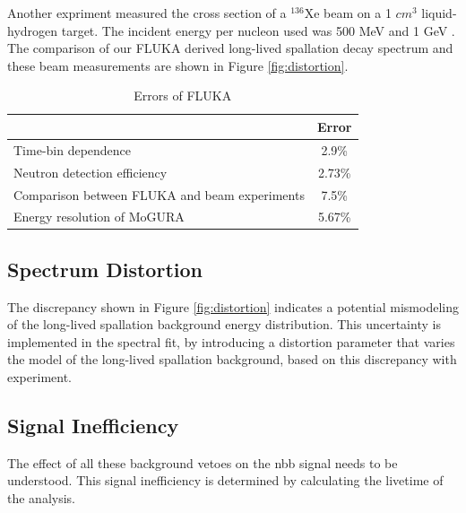 Another expriment measured the cross section of a $^{136}$Xe beam on a 1 $cm^3$ liquid-hydrogen target. The incident energy per nucleon used was 500 MeV \cite{xenonbeam_500MeV} and 1 GeV \cite{xenonbeam_1GeV}. The comparison of our FLUKA derived long-lived spallation decay spectrum and these beam measurements are shown in Figure \ref{fig:distortion}. 


\begin{table}[h]
	\centering
	\begin{tabular}{lc}
		\hline
		& Error \\
		\hline
		Time-bin dependence & 2.9\% \\
		Neutron detection efficiency & 2.73\% \\
		Comparison between FLUKA and beam experiments & 7.5\% \\
		Energy resolution of MoGURA & 5.67\% \\
		\hline
	\end{tabular}
	\caption{Errors of FLUKA}
	\label{tab:fluka_error}
\end{table}

\subsection*{Spectrum Distortion}
The discrepancy shown in Figure \ref{fig:distortion} indicates a potential mismodeling of the long-lived spallation background energy distribution. This uncertainty is implemented in the spectral fit, by introducing a distortion parameter that varies the model of the long-lived spallation background, based on this discrepancy with experiment.
\subsection{Signal Inefficiency}
The effect of all these background vetoes on the \0nbb signal needs to be understood. This signal inefficiency is determined by calculating the livetime of the analysis. 

